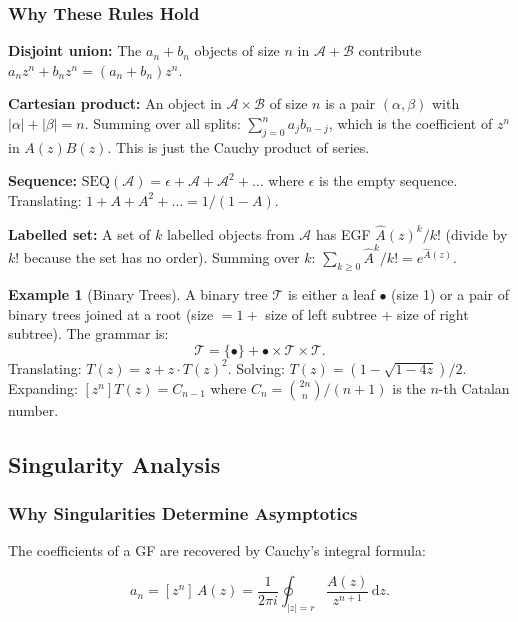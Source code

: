 \documentclass[11pt,a4paper]{article}
\theoremstyle{definition}
\newtheorem{example}[theorem]{Example}
\newcommand{\diff}{\,\mathrm{d}}
\begin{document}
\subsubsection{Why These Rules Hold}

\textbf{Disjoint union:} The $a_n + b_n$ objects of size $n$ in $\mathcal{A}+\mathcal{B}$
contribute $a_n z^n + b_n z^n = (a_n + b_n)z^n$.

\textbf{Cartesian product:} An object in $\mathcal{A}\times\mathcal{B}$ of size $n$
is a pair $(\alpha, \beta)$ with $|\alpha| + |\beta| = n$. Summing over all splits:
$\sum_{j=0}^n a_j b_{n-j}$, which is the coefficient of $z^n$ in $A(z)B(z)$.
This is just the Cauchy product of series.

\textbf{Sequence:} $\mathrm{SEQ}(\mathcal{A}) = \epsilon + \mathcal{A} + \mathcal{A}^2 + \ldots$
where $\epsilon$ is the empty sequence. Translating: $1 + A + A^2 + \ldots = 1/(1-A)$.

\textbf{Labelled set:} A set of $k$ labelled objects from $\mathcal{A}$ has EGF
$\hat{A}(z)^k/k!$ (divide by $k!$ because the set has no order). Summing over $k$:
$\sum_{k\geq 0} \hat{A}^k/k! = e^{\hat{A}(z)}$.

\begin{example}[Binary Trees]
A binary tree $\mathcal{T}$ is either a leaf $\bullet$ (size 1) or a pair of
binary trees joined at a root (size $= 1 + $ size of left subtree $+$ size of
right subtree). The grammar is:
\[
  \mathcal{T} = \{\bullet\} + \bullet \times \mathcal{T} \times \mathcal{T}.
\]
Translating: $T(z) = z + z\cdot T(z)^2$. Solving: $T(z) = (1-\sqrt{1-4z})/2$.
Expanding: $[z^n]T(z) = C_{n-1}$ where $C_n = \binom{2n}{n}/(n+1)$ is the $n$-th
Catalan number.
\end{example}

\subsection{Singularity Analysis}
\label{sec:singularity}

\subsubsection{Why Singularities Determine Asymptotics}

The coefficients of a GF are recovered by Cauchy's integral formula:

\begin{equation}
  a_n = [z^n]\,A(z) = \frac{1}{2\pi i}\oint_{|z|=r} \frac{A(z)}{z^{n+1}}\diff z.
  \label{eq:cauchy}
\end{equation}
\end{document}
